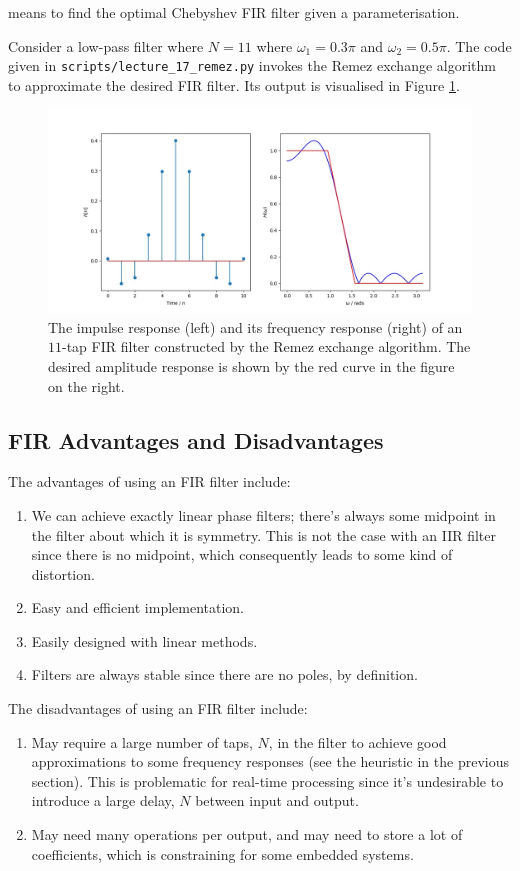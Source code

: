 means to find the optimal Chebyshev FIR filter given a parameterisation.
%
\begin{exmp}
  Consider a low-pass filter where $N=11$ where $\omega_1 = 0.3\pi$ and
  $\omega_2 = 0.5\pi$. The code given in \texttt{scripts/lecture\_17\_remez.py}
  invokes the Remez exchange algorithm to approximate the desired FIR filter.
  Its output is visualised in Figure \ref{fig::lecture_17_remez_example}.
  \begin{figure}[!htb]
    \includegraphics[width=\textwidth]{images/lecture_17_remez_example.JPG}
    \caption{The impulse response (left) and its frequency response
      (right) of an $11$-tap FIR filter constructed by the Remez exchange
      algorithm. The desired amplitude response is shown by the red
      curve in the figure on the right.
    }
    \label{fig::lecture_17_remez_example}
  \end{figure}
\end{exmp}

\subsection{FIR Advantages and Disadvantages}
%
The advantages of using an FIR filter include:
%
\begin{enumerate}
\item We can achieve exactly linear phase filters; there's always
  some midpoint in the filter about which it is symmetry. This is
  not the case with an IIR filter since there is no midpoint, which
  consequently leads to some kind of distortion.
\item Easy and efficient implementation.
\item Easily designed with linear methods.
\item Filters are always stable since there are no poles, by definition.
\end{enumerate}
%
The disadvantages of using an FIR filter include:
%
\begin{enumerate}
\item May require a large number of taps, $N$, in the filter to achieve good
  approximations to some frequency responses (see the heuristic in
  the previous section). This is problematic for real-time processing since
  it's undesirable to introduce a large delay, $N$ between input and
  output.
\item May need many operations per output, and may need to store
  a lot of coefficients, which is constraining for some embedded systems.
\end{enumerate}
